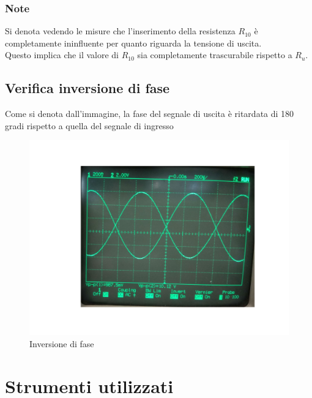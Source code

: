 \documentclass{article}
\begin{document}
\subsubsection{Note}
Si denota vedendo le misure che l'inserimento della resistenza $R_{10}$ è completamente ininfluente per quanto riguarda la tensione di uscita.\\Questo implica che il valore di $R_{10}$ sia completamente 
trascurabile rispetto a $R_{u}$.
\subsection{Verifica inversione di fase}
Come si denota dall'immagine, la fase del segnale di uscita è ritardata di 180 gradi rispetto a quella del segnale di ingresso
\begin{figure}[!h]
  \includegraphics[width=\textwidth]{fase.jpg}
  \caption{Inversione di fase}
  \label{fig:invfase1}
\end{figure}
\section{Strumenti utilizzati}
\end{document}
